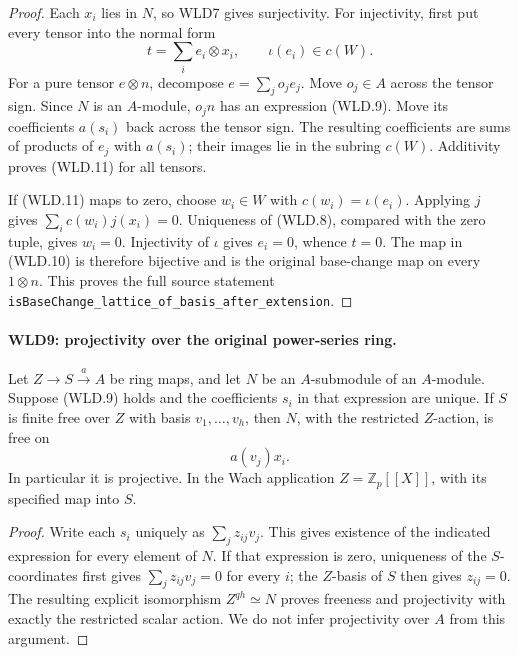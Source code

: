 \documentclass[11pt,a4paper]{article}
\numberwithin{equation}{section}
\theoremstyle{remark}\newtheorem{remark}[theorem]{Remark}
\begin{document}
\begin{proof}
Each $x_i$ lies in $N$, so WLD7 gives surjectivity.
For injectivity, first put every tensor into the normal form
\[
              t=\sum_i e_i\otimes x_i,\qquad
                                      \iota(e_i)\in c(W).
                                                               \tag{WLD.11}
\]
For a pure tensor $e\otimes n$, decompose $e=\sum_j o_je_j$.
Move $o_j\in A$ across the tensor sign. Since $N$ is an
$A$-module, $o_jn$ has an expression (WLD.9). Move its coefficients
$a(s_i)$ back across the tensor sign. The resulting coefficients
are sums of products of $e_j$ with $a(s_i)$; their images lie in
the subring $c(W)$. Additivity proves (WLD.11) for all tensors.

If (WLD.11) maps to zero, choose $w_i\in W$ with
$c(w_i)=\iota(e_i)$. Applying $j$ gives
$\sum_i c(w_i)j(x_i)=0$. Uniqueness of (WLD.8), compared with
the zero tuple, gives $w_i=0$. Injectivity of $\iota$ gives
$e_i=0$, whence $t=0$. The map in (WLD.10) is therefore bijective
and is the original base-change map on every $1\otimes n$.
This proves the full source statement
\texttt{is\allowbreak Base\allowbreak Change\_\allowbreak lattice\_\allowbreak of\_\allowbreak basis\_\allowbreak after\_\allowbreak extension}.
\end{proof}

\paragraph{WLD9: projectivity over the original power-series ring.}
\label{claim:WLD9}
Let $Z\to S\xrightarrow{a}A$ be ring maps, and let $N$ be an
$A$-submodule of an $A$-module. Suppose (WLD.9) holds and the
coefficients $s_i$ in that expression are unique. If
$S$ is finite free over $Z$ with basis $v_1,\ldots,v_h$, then
$N$, with the restricted $Z$-action, is free on
\[
                              a(v_j)x_i.
\]
In particular it is projective. In the Wach application
$Z=\mathbb Z_p[[X]]$, with its specified map into $S$.

\begin{proof}
Write each $s_i$ uniquely as $\sum_j z_{ij}v_j$.
This gives existence of the indicated expression for every element
of $N$. If that expression is zero, uniqueness of the $S$-coordinates
first gives $\sum_jz_{ij}v_j=0$ for every $i$; the $Z$-basis of $S$
then gives $z_{ij}=0$. The resulting explicit isomorphism
$Z^{qh}\simeq N$ proves freeness and projectivity with exactly the
restricted scalar action. We do not infer projectivity over $A$
from this argument.
\end{proof}
\end{document}
